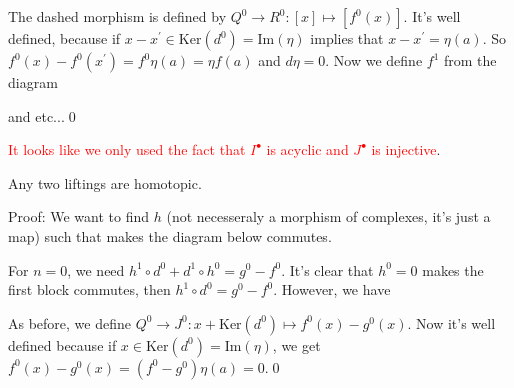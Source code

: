 \begin{itemize}
\begin{center}
\begin{tikzcd}
        \end{tikzcd}
    \end{center}
    The dashed morphism is defined by $Q^0\to R^0: [x]\mapsto [f^0(x)]$. It's well defined, because 
    if $x-x^\prime\in\text{Ker}(d^0)=\text{Im}(\eta)$ implies that $x-x^\prime=\eta(a)$. So 
    $f^0(x)-f^0(x^\prime)=f^0\eta(a)=\eta f(a)$ and $d\eta=0$. Now we define $f^1$ from the diagram
    \begin{center}
    \end{center}
    and etc...\qed

    \begin{remark}
        \textcolor{red}{It looks like we only used the fact that $I^\bullet$ is acyclic and 
        $J^\bullet$ is injective}.
    \end{remark}

    \begin{lemma}
        Any two liftings are homotopic.
    \end{lemma}
    Proof: We want to find $h$ (not necesseraly a morphism of complexes, it's just a map) 
    such that makes the diagram below commutes. 
    \begin{center}
        \end{center}
    For $n=0$, we need $h^1\circ d^0+d^1\circ h^0=g^0-f^0$. It's clear that $h^0=0$ makes the first block 
    commutes, then $h^1\circ d^0 = g^0-f^0$. However, we have 
    \begin{center}
    \end{center}
    As before, we define $Q^0\to J^0: x + \text{Ker}(d^0)\mapsto f^0(x)-g^0(x)$. Now it's well defined because if 
    $x\in\text{Ker}(d^0)=\text{Im}(\eta)$, we get $f^0(x)-g^0(x)=(f^0-g^0)\eta(a)=0$.\qed


\end{itemize}
